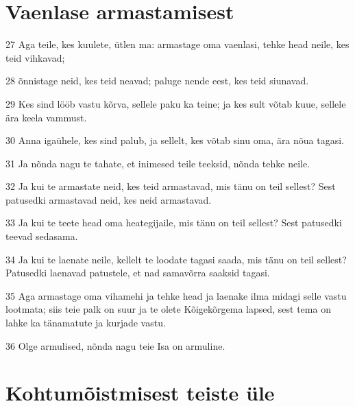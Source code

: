 \section*{Vaenlase armastamisest}

\par 27 Aga teile, kes kuulete, ütlen ma: armastage oma vaenlasi, tehke head neile, kes teid vihkavad;
\par 28 õnnistage neid, kes teid neavad; paluge nende eest, kes teid siunavad.
\par 29 Kes sind lööb vastu kõrva, sellele paku ka teine; ja kes sult võtab kuue, sellele ära keela vammust.
\par 30 Anna igaühele, kes sind palub, ja sellelt, kes võtab sinu oma, ära nõua tagasi.
\par 31 Ja nõnda nagu te tahate, et inimesed teile teeksid, nõnda tehke neile.
\par 32 Ja kui te armastate neid, kes teid armastavad, mis tänu on teil sellest? Sest patusedki armastavad neid, kes neid armastavad.
\par 33 Ja kui te teete head oma heategijaile, mis tänu on teil sellest? Sest patusedki teevad sedasama.
\par 34 Ja kui te laenate neile, kellelt te loodate tagasi saada, mis tänu on teil sellest? Patusedki laenavad patustele, et nad samavõrra saaksid tagasi.
\par 35 Aga armastage oma vihamehi ja tehke head ja laenake ilma midagi selle vastu lootmata; siis teie palk on suur ja te olete Kõigekõrgema lapsed, sest tema on lahke ka tänamatute ja kurjade vastu.
\par 36 Olge armulised, nõnda nagu teie Isa on armuline.

\section*{Kohtumõistmisest teiste üle}

